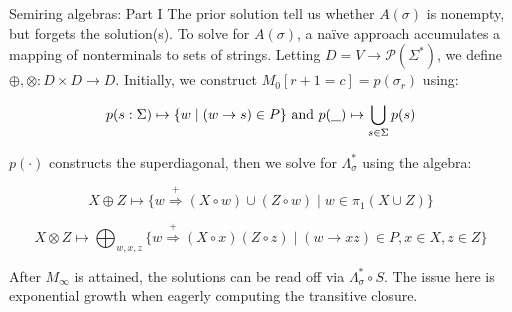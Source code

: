 \documentclass{beamer}
\newcommand{\hole}{\underline{\hspace{0.25cm}}}
\begin{document}
\begin{frame}[fragile]{Semiring algebras: Part I}
  The prior solution tell us whether $A(\sigma)$ is nonempty, but forgets the solution(s). To solve for $A(\sigma)$, a na\"ive approach accumulates a mapping of nonterminals to sets of strings. Letting $D = V \rightarrow \mathcal{P}(\Sigma^*)$, we define $\oplus, \otimes: D \times D \rightarrow D$. Initially, we construct $M_0[r+1=c] = p(\sigma_r)$ using:

  \begin{equation*}
    p(s: \Sigma) \mapsto \{w \mid (w \rightarrow s)\in P\} \text{ and } p(\hole) \mapsto \bigcup_{s\in \Sigma} p(s)
  \end{equation*}

  $p(\cdot)$ constructs the superdiagonal, then we solve for $\Lambda_\sigma^*$ using the algebra:

  \begin{equation*}
    X \oplus Z \mapsto \big\{w \stackrel{+}{\Rightarrow} (X \circ w) \cup (Z \circ w) \mid w \in \pi_1(X \cup Z)\big\}
  \end{equation*}

  \begin{equation*}
    X \otimes Z \mapsto \bigoplus_{w, x, z}\big\{w \stackrel{+}{\Rightarrow} (X\circ x)(Z\circ z) \mid (w\rightarrow xz) \in P, x\in X, z\in Z\big\}
  \end{equation*}

  \noindent After $M_\infty$ is attained, the solutions can be read off via $\Lambda_\sigma^* \circ S$. The issue here is exponential growth when eagerly computing the transitive closure.
\end{frame}
\end{document}
